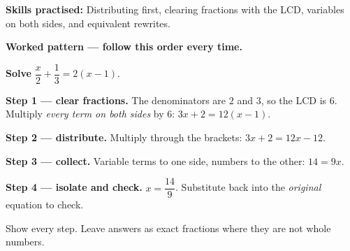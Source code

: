 \documentclass[12pt]{article}
\begin{document}

\noindent\small\textbf{Skills practised:} Distributing first, clearing fractions with the LCD,
variables on both sides, and equivalent rewrites.
\smallskip

\noindent\textbf{Worked pattern --- follow this order every time.}
\smallskip

\noindent\begin{minipage}{\linewidth}\small
\textbf{Solve} $\dfrac{x}{2} + \dfrac{1}{3} = 2(x - 1)$.\par\vspace{2pt}
\textbf{Step 1 --- clear fractions.} The denominators are $2$ and $3$, so the LCD is $6$.
Multiply \emph{every term on both sides} by $6$: \quad $3x + 2 = 12(x - 1)$.\par\vspace{1pt}
\textbf{Step 2 --- distribute.} Multiply through the brackets: \quad $3x + 2 = 12x - 12$.
\par\vspace{1pt}
\textbf{Step 3 --- collect.} Variable terms to one side, numbers to the other: \quad $14 = 9x$.
\par\vspace{1pt}
\textbf{Step 4 --- isolate and check.} $x = \dfrac{14}{9}$. Substitute back into the
\emph{original} equation to check.
\end{minipage}
\smallskip

\noindent\small Show every step. Leave answers as exact fractions where they are not whole numbers.
\normalsize





\end{document}
